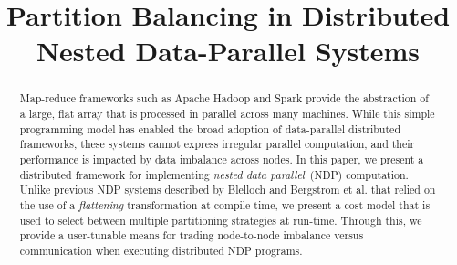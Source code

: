 \documentclass[preprint]{sigplanconf}
\theoremstyle{definition}
\begin{document}
\setlength{\pdfpageheight}{\paperheight}
\setlength{\pdfpagewidth}{\paperwidth}







\title{Partition Balancing in Distributed Nested Data-Parallel Systems}
\authorinfo{ }
{ }
{ }


\maketitle

\raggedbottom

\begin{abstract}

Map-reduce frameworks such as Apache Hadoop and Spark provide the abstraction of a large, flat
array that is processed in parallel across many machines. While this simple programming model has
enabled the broad adoption of data-parallel distributed frameworks, these systems cannot express
irregular parallel computation, and their performance is impacted by data imbalance across nodes.
In this paper, we present a distributed framework for implementing \emph{nested data parallel}~(NDP)
computation. Unlike previous NDP systems described by Blelloch and Bergstrom et al. that relied on
the use of a \emph{flattening} transformation at compile-time, we present a cost model that is used
to select between multiple partitioning strategies at run-time. Through this, we provide a user-tunable
means for trading node-to-node imbalance versus communication when executing distributed NDP
programs.

\end{abstract}
\end{document}
